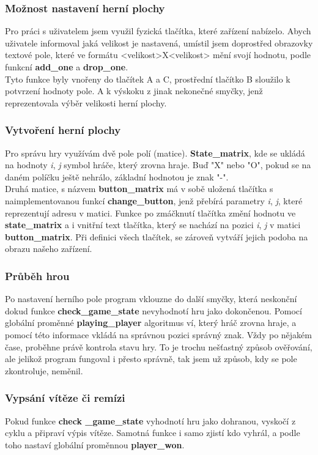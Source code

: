 \documentclass[a4paper,12pt]{article}
\begin{document}
\subsubsection{Možnost nastavení herní plochy}
Pro práci s uživatelem jsem využil fyzická tlačítka, které zařízení nabízelo. Abych uživatele informoval jaká velikost je nastavená, umístil jsem doprostřed obrazovky textové pole, které ve formátu <velikost>X<velikost> mění svojí hodnotu, podle funkcní \textbf{add\_one} a \textbf{drop\_one}. \\
Tyto funkce byly vnořeny do tlačítek A a C, prostřední tlačítko B sloužilo k potvrzení hodnoty pole. A k výskoku z jinak nekonečné smyčky, jenž reprezentovala výběr velikosti herní plochy.
\subsubsection{Vytvoření herní plochy}
Pro správu hry využívám dvě pole polí (matice). \textbf{State\_matrix}, kde se ukládá na hodnoty \textit{i}, \textit{j} symbol hráče, který zrovna hraje. Buď "X" nebo "O", pokud se na daném políčku ještě nehrálo, základní hodnotou je znak "-".\\
Druhá matice, s názvem \textbf{button\_matrix} má v sobě uložená tlačítka s naimplementovanou funkcí \textbf{change\_button}, jenž přebírá parametry \textit{i}, \textit{j}, které reprezentují adresu v matici. Funkce po zmáčknutí tlačítka změní hodnotu ve \textbf{state\_matrix} a i vnitřní text tlačítka, který se nachází na pozici \textit{i}, \textit{j} v matici \textbf{button\_matrix}. Při definici všech tlačítek, se zároveň vytváří jejich podoba na obrazu našeho zařízení.
\subsubsection{Průběh hrou}
Po nastavení herního pole program vklouzne do další smyčky, která neskonční dokud funkce \textbf{check\_game\_state} nevyhodnotí hru jako dokončenou. Pomocí globální proměnné \textbf{playing\_player} algoritmus ví, který hráč zrovna hraje, a pomocí této informace vkládá na správnou pozici správný znak. Vždy po nějakém čase, proběhne právě kontrola stavu hry. To je trochu nešťastný způsob ověřování, ale jelikož program fungoval i přesto správně, tak jsem už způsob, kdy se pole zkontroluje, neměnil.
\subsubsection{Vypsání vítěze či remízi}
Pokud funkce \textbf{check \_game\_state} vyhodnotí hru jako dohranou, vyskočí z cyklu a připraví výpis vítěze. Samotná funkce i samo zjistí kdo vyhrál, a podle toho nastaví globální proměnnou \textbf{player\_won}.
\end{document}
